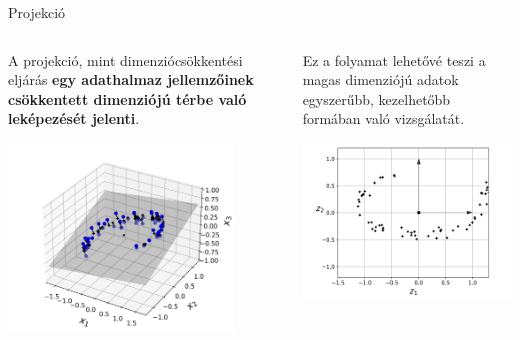 \documentclass[english, aspectratio=169]{beamer}
\begin{document}
\begin{frame}{Projekció}
\begin{columns}
\begin{column}{.5\textwidth}
A projekció, mint dimenziócsökkentési eljárás \textbf{egy adathalmaz jellemzőinek csökkentett dimenziójú térbe való leképezését jelenti}.
\begin{center}
\includegraphics[width=6cm, keepaspectratio]{images/unsupervised_3.png}
\end{center}
\end{column}
\begin{column}{.5\textwidth}
Ez a folyamat lehetővé teszi a magas dimenziójú adatok egyszerűbb, kezelhetőbb formában való vizsgálatát. 
\begin{center}
\includegraphics[width=6cm, keepaspectratio]{images/unsupervised_4.png}
\end{center}
\end{column}
\end{columns}
\end{frame}
\end{document}

